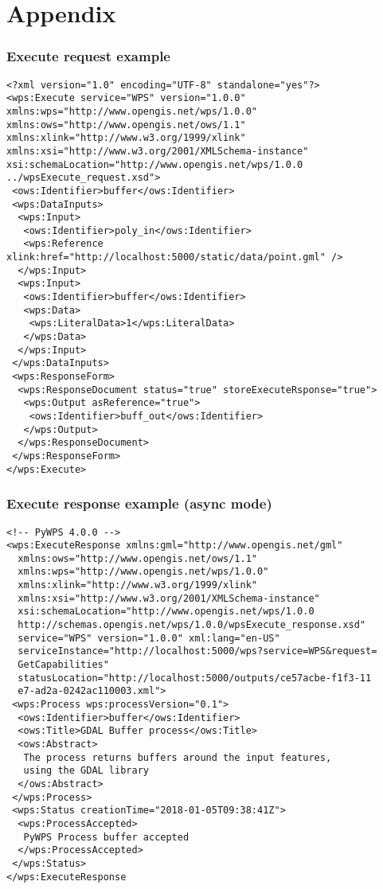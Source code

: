 \newpage
\part{Appendix}

\appendix
\newpage
\section{Execute request example}
\label{app:ExecuteRequest}
\begin{lstlisting}[basicstyle=\small,caption={Execute request example}]
<?xml version="1.0" encoding="UTF-8" standalone="yes"?>
<wps:Execute service="WPS" version="1.0.0" xmlns:wps="http://www.opengis.net/wps/1.0.0" xmlns:ows="http://www.opengis.net/ows/1.1" xmlns:xlink="http://www.w3.org/1999/xlink" xmlns:xsi="http://www.w3.org/2001/XMLSchema-instance" xsi:schemaLocation="http://www.opengis.net/wps/1.0.0 ../wpsExecute_request.xsd">
 <ows:Identifier>buffer</ows:Identifier>
 <wps:DataInputs>
  <wps:Input>
   <ows:Identifier>poly_in</ows:Identifier>
   <wps:Reference xlink:href="http://localhost:5000/static/data/point.gml" />
  </wps:Input>
  <wps:Input>
   <ows:Identifier>buffer</ows:Identifier>
   <wps:Data>
    <wps:LiteralData>1</wps:LiteralData>
   </wps:Data>
  </wps:Input>
 </wps:DataInputs>
 <wps:ResponseForm>
  <wps:ResponseDocument status="true" storeExecuteRsponse="true">
   <wps:Output asReference="true">
    <ows:Identifier>buff_out</ows:Identifier>
   </wps:Output>
  </wps:ResponseDocument>
 </wps:ResponseForm>
</wps:Execute>
\end{lstlisting}

\newpage
\section{Execute response example (async mode)}
\label{app:ExecuteResponse}
\begin{lstlisting}[basicstyle=\small,caption={Execute response example (async mode)}]
<!-- PyWPS 4.0.0 -->
<wps:ExecuteResponse xmlns:gml="http://www.opengis.net/gml" 
  xmlns:ows="http://www.opengis.net/ows/1.1" 
  xmlns:wps="http://www.opengis.net/wps/1.0.0" 
  xmlns:xlink="http://www.w3.org/1999/xlink" 
  xmlns:xsi="http://www.w3.org/2001/XMLSchema-instance" 
  xsi:schemaLocation="http://www.opengis.net/wps/1.0.0 
  http://schemas.opengis.net/wps/1.0.0/wpsExecute_response.xsd" 
  service="WPS" version="1.0.0" xml:lang="en-US" 
  serviceInstance="http://localhost:5000/wps?service=WPS&request=
  GetCapabilities" 
  statusLocation="http://localhost:5000/outputs/ce57acbe-f1f3-11
  e7-ad2a-0242ac110003.xml">
 <wps:Process wps:processVersion="0.1">
  <ows:Identifier>buffer</ows:Identifier>
  <ows:Title>GDAL Buffer process</ows:Title>
  <ows:Abstract>
   The process returns buffers around the input features,
   using the GDAL library
  </ows:Abstract>
 </wps:Process>
 <wps:Status creationTime="2018-01-05T09:38:41Z">
  <wps:ProcessAccepted>
   PyWPS Process buffer accepted
  </wps:ProcessAccepted>
 </wps:Status>
</wps:ExecuteResponse
\end{lstlisting}

